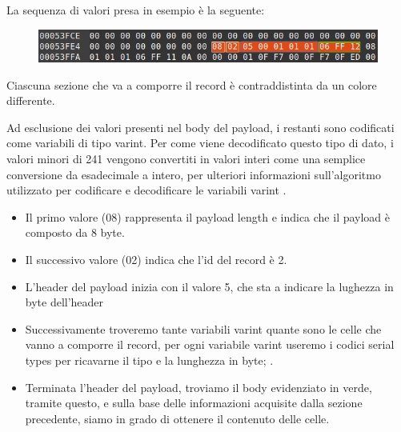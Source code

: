 La sequenza di valori presa in esempio è la seguente:

\begin{figure}[ht]
	\centering
	\includegraphics[scale=0.6, ]{assets/hex_record}
	\label{fig:hexrecord}
\end{figure}

Ciascuna sezione che va a comporre il record è contraddistinta da un colore differente.


Ad esclusione dei valori presenti nel body del payload, i restanti sono codificati come variabili di tipo varint. 
Per come viene decodificato questo tipo di dato, i valori minori di 241 vengono convertiti in valori interi come una semplice conversione da esadecimale a intero, per ulteriori informazioni sull'algoritmo utilizzato per codificare e decodificare le variabili varint \cite{varint}.


\begin{itemize}
\item Il primo valore (08) rappresenta il payload length e indica che il payload è composto da 8 byte.
\item Il successivo valore (02) indica che l'id del record è 2. 
\item L'header del payload inizia con il valore 5, che sta a indicare la lughezza in byte dell'header
\item Successivamente troveremo tante variabili varint quante sono le celle che vanno a comporre il record, per ogni variabile varint useremo i codici serial types per ricavarne il tipo e la lunghezza in byte;
.
\item Terminata l'header del payload, troviamo il body evidenziato in verde, tramite questo, e sulla base delle informazioni acquisite dalla sezione precedente, siamo in grado di ottenere il contenuto delle celle.
\end{itemize}

